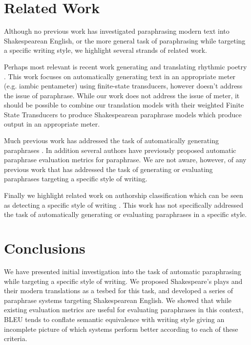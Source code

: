 \documentclass[10pt,a5paper,twoside]{article}
\begin{document}
\section{Related Work}
Although no previous work has investigated paraphrasing modern text into Shakespearean English, or the more general task of paraphrasing while targeting a specific writing
style, we highlight several strands of related work.

Perhaps most relevant is recent work generating and translating rhythmic poetry \cite{Greene10}.  This work focuses on automatically generating text in an appropriate
meter (e.g. iambic pentameter) using finite-state transducers, however doesn't address the issue of paraphrase.  
While our work does not address the issue of meter, it should be possible to combine our translation
models with their weighted Finite State Transducers to produce Shakespearean paraphrase models which produce output in an appropriate meter.

Much previous work has addressed the task of automatically generating paraphrases \cite{Barzilay03,dolan04,Shinyama03,Das09,bannard05,Callison-Burch08,Kok10}.  In addition several authors have previously proposed 
automatic paraphrase evaluation metrics \cite{chen11,Callison-Burch08b,Bangalore00,liu10} for paraphrase.
We are not aware, however, of any previous work that has addressed the task of generating or evaluating
paraphrases targeting a specific style of writing.

Finally we highlight related work on authorship classification which can be seen as detecting a specific style of writing \cite{Gamon04,Raghavan10}.
This work has not specifically addressed the task of automatically generating or evaluating paraphrases in a specific style.

\section{Conclusions}
We have presented initial investigation into the task of automatic paraphrasing while targeting a specific style of writing.  We proposed Shakespeare's plays and their
modern translations as a tesbed for this task, and developed a series of paraphrase systems targeting Shakespearean English.  We showed that while existing evaluation
metrics are useful for evaluating paraphrases in this context, BLEU tends to conflate semantic equivalence with writing style giving an incomplete picture of which systems
perform better according to each of these criteria.  
\end{document}
